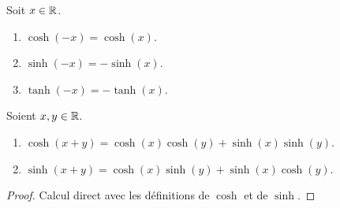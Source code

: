 \begin{proposition}
	Soit $x \in \mathbb{R}$.
	\begin{enumerate}
		\item $\cosh(-x) = \cosh(x)$.
		\item $\sinh(-x) = -\sinh(x)$.
		\item $\tanh(-x) = -\tanh(x)$.
	\end{enumerate}
\end{proposition}

\begin{proposition}
	Soient $x, y \in \mathbb{R}$.
    \begin{enumerate}
        \item $\cosh(x + y) = \cosh(x) \cosh(y) + \sinh(x) \sinh(y)$.
        \item $\sinh(x + y) = \cosh(x) \sinh(y) + \sinh(x) \cosh(y)$.
    \end{enumerate}
\end{proposition}

\begin{proof}
    Calcul direct avec les définitions de $\cosh$ et de $\sinh$.
\end{proof}

